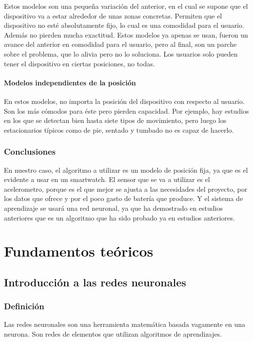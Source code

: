 \documentclass[12pt]{article}
\numberwithin{equation}{section}
\begin{document}
Estos modelos son una pequeña variación del anterior, en el cual se supone que el dispositivo va a estar alrededor de unas zonas concretas. Permiten que el dispositivo no esté absolutamente fijo, lo cual es una comodidad para el usuario. Además no pierden mucha exactitud. Estos modelos ya apenas se usan, fueron un avance del anterior en comodidad para el usuario, pero al final, son un parche sobre el problema, que lo alivia pero no lo soluciona. Los usuarios solo pueden tener el dispositivo en ciertas posiciones, no todas.

\paragraph{Modelos independientes de la posición}

En estos modelos, no importa la posición del dispositivo con respecto al usuario. Son los más cómodos para éste pero pierden capacidad. Por ejemplo, hay estudios en los que se detectan bien hasta siete tipos de movimiento, pero luego los estacionarios típicos como de pie, sentado y tumbado no es capaz de hacerlo\cite{6488584}.%

\subsubsection{Conclusiones}

En nuestro caso, el algoritmo a utilizar es un modelo de posición fija, ya que es el evidente a usar en un smartwatch. El sensor que se va a utilizar es el acelerometro, porque es el que mejor se ajusta a las necesidades del proyecto, por los datos que ofrece y por el poco gasto de batería que produce. Y el sistema de aprendizaje se usará una red neuronal, ya que ha demostrado en estudios anteriores que es un algoritmo que ha sido probado ya en estudios anteriores.


\newpage
\section{Fundamentos teóricos}
\subsection{Introducción a las redes neuronales}
\subsubsection{Definición}
Las redes neuronales son una herramienta matemática basada vagamente en una neurona. Son redes de elementos que utilizan algoritmos de aprendizajes.
\end{document}
